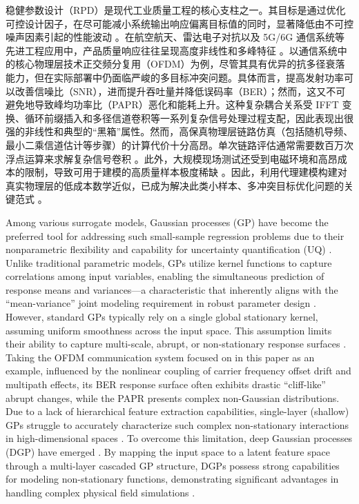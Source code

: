 \documentclass[11pt]{article}
\begin{document}
稳健参数设计（RPD）是现代工业质量工程的核心支柱之一。其目标是通过优化可控设计因子，在尽可能减小系统输出响应偏离目标值的同时，显著降低由不可控噪声因素引起的性能波动 \citep{Taguchi1986, Joseph2006, Montgomery2017, Hamada2021}。在航空航天、雷达电子对抗以及 5G/6G 通信系统等先进工程应用中，产品质量响应往往呈现高度非线性和多峰特征 \citep{Wang2020, Liu2025, Gnanasambandam2025, SongJ2025}。以通信系统中的核心物理层技术正交频分复用（OFDM）为例，尽管其具有优异的抗多径衰落能力，但在实际部署中仍面临严峻的多目标冲突问题。具体而言，提高发射功率可以改善信噪比（SNR），进而提升吞吐量并降低误码率（BER）；然而，这又不可避免地导致峰均功率比（PAPR）恶化和能耗上升。这种复杂耦合关系受 IFFT 变换、循环前缀插入和多径信道卷积等一系列复杂信号处理过程支配，因此表现出很强的非线性和典型的“黑箱”属性。然而，高保真物理层链路仿真（包括随机导频、最小二乘信道估计等步骤）的计算代价十分高昂。单次链路评估通常需要数百万次浮点运算来求解复杂信号卷积 \citep{Song2025}。此外，大规模现场测试还受到电磁环境和高昂成本的限制，导致可用于建模的高质量样本极度稀缺 \citep{Ming2022, Sauer2022, Ghandwani2025}。因此，利用代理建模构建对真实物理层的低成本数学近似，已成为解决此类小样本、多冲突目标优化问题的关键范式 \citep{Luo2022, LiY2025}。

Among various surrogate models, Gaussian processes (GP) have become the preferred tool for addressing such small-sample regression problems due to their nonparametric flexibility and capability for uncertainty quantification (UQ) \citep{Williams2006, Deng2017, Joseph2019}. Unlike traditional parametric models, GPs utilize kernel functions to capture correlations among input variables, enabling the simultaneous prediction of response means and variances—a characteristic that inherently aligns with the ``mean-variance'' joint modeling requirement in robust parameter design \citep{Gramacy2020, Wang2025}. However, standard GPs typically rely on a single global stationary kernel, assuming uniform smoothness across the input space. This assumption limits their ability to capture multi-scale, abrupt, or non-stationary response surfaces \citep{Ko2022, Sauer2023, Tao2025}. Taking the OFDM communication system focused on in this paper as an example, influenced by the nonlinear coupling of carrier frequency offset drift and multipath effects, its BER response surface often exhibits drastic ``cliff-like'' abrupt changes, while the PAPR presents complex non-Gaussian distributions. Due to a lack of hierarchical feature extraction capabilities, single-layer (shallow) GPs struggle to accurately characterize such complex non-stationary interactions in high-dimensional spaces \citep{Zhai2022, Lin2024, WangX2025}. To overcome this limitation, deep Gaussian processes (DGP) have emerged \citep{Damianou2013}. By mapping the input space to a latent feature space through a multi-layer cascaded GP structure, DGPs possess strong capabilities for modeling non-stationary functions, demonstrating significant advantages in handling complex physical field simulations \citep{Muller2017, Ding2024}. 
\end{document}
